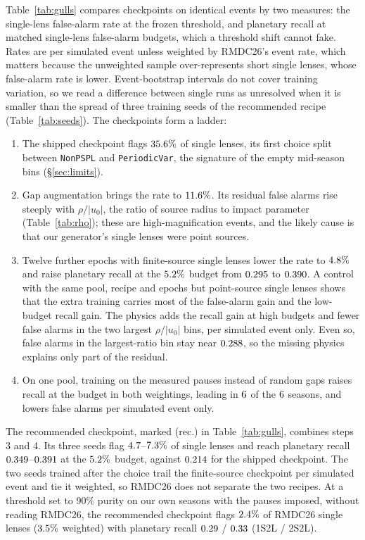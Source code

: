 \documentclass[twocolumn,linenumbers,floatfix,twocolappendix]{aastex701}
\begin{document}
Table~\ref{tab:gulls} compares checkpoints on identical events by two measures: the single-lens false-alarm rate at
the frozen threshold, and planetary recall at matched single-lens false-alarm budgets, which a threshold shift cannot
fake. Rates are per simulated event unless weighted by RMDC26's event rate, which matters because the
unweighted sample over-represents short single lenses, whose false-alarm rate is lower. Event-bootstrap intervals do
not cover training variation, so we read a difference between single runs as unresolved when it is smaller than the
spread of three training seeds of the recommended recipe (Table~\ref{tab:seeds}). The checkpoints form a ladder:
\begin{enumerate}
\item The shipped checkpoint flags $35.6\%$ of single lenses, its first choice split between
\texttt{NonPSPL} and \texttt{PeriodicVar}, the signature of the empty mid-season bins (\S\ref{sec:limits}).
\item Gap augmentation brings the rate to $11.6\%$. Its residual false alarms rise steeply with
$\rho/|u_0|$, the ratio of source radius to impact parameter (Table~\ref{tab:rho}); these are high-magnification
events, and the likely cause is that our generator's single lenses were point sources.
\item Twelve further epochs with finite-source single lenses \citep{Bozza2018} lower the rate to $4.8\%$
and raise planetary recall at the $5.2\%$ budget from $0.295$ to $0.390$. A
control with the same pool, recipe and epochs but point-source single lenses shows that the extra training carries
most of the false-alarm gain and the low-budget recall gain. The physics adds the recall gain at high budgets and
fewer false alarms in the two largest $\rho/|u_0|$ bins, per simulated event only. Even so, false alarms in the
largest-ratio bin stay near $0.288$, so the missing physics explains only part of the residual.
\item On one pool, training on the measured pauses instead of random gaps raises recall at the budget in both
weightings, leading in $6$ of the $6$ seasons, and lowers false alarms per
simulated event only.
\end{enumerate}
The recommended checkpoint, marked (rec.) in Table~\ref{tab:gulls}, combines steps 3 and 4. Its three seeds flag
$4.7$--$7.3\%$ of single lenses and reach planetary recall $0.349$--$0.391$ at the
$5.2\%$ budget, against $0.214$ for the shipped checkpoint. The two seeds trained after
the choice trail the finite-source checkpoint per simulated event and tie it weighted, so RMDC26 does not separate the
two recipes. At a threshold set to 90\% purity on our own seasons with the pauses imposed, without reading RMDC26, the
recommended checkpoint flags $2.4\%$ of RMDC26 single lenses ($3.5\%$ weighted) with planetary
recall $0.29$ / $0.33$ (1S2L / 2S2L).
\end{document}
